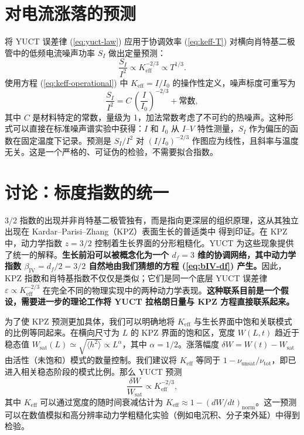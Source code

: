 \documentclass[12pt,a4paper]{article}
\newcommand{\Keff}{K_{\mathrm{eff}}}
\begin{document}
	\section{对电流涨落的预测}
	\label{sec:predictions}
	将 YUCT 误差律 (\ref{eq:yuct-law}) 应用于协调效率 (\ref{eq:keff-T}) 对横向肖特基二极管中的低频电流噪声功率 $S_I$ 做出定量预测：
	\begin{equation}
		\frac{S_I}{I^2} \propto \Keff^{-2/3} \propto T^{1/3}.
		\label{eq:noise-pred}
	\end{equation}
	使用方程 (\ref{eq:keff-operational}) 中 $\Keff = I/I_0$ 的操作性定义，噪声标度可重写为
	\begin{equation}
		\frac{S_I}{I^2} = C \, \left(\frac{I}{I_0}\right)^{-2/3} + \text{常数},
		\label{eq:noise-operational}
	\end{equation}
	其中 $C$ 是材料特定的常数，量级为 1，加法常数考虑了不可约的热噪声。这种形式可以直接在标准噪声谱实验中获得：$I$ 和 $I_0$ 从 $I$–$V$ 特性测量，$S_I$ 作为偏压的函数在固定温度下记录。预测是 $S_I/I^2$ 对 $(I/I_0)^{-2/3}$ 作图应为线性，且斜率与温度无关。这是一个严格的、可证伪的检验，不需要拟合指数。
	
	\section{讨论：标度指数的统一}
	
	$3/2$ 指数的出现并非肖特基二极管独有，而是指向更深层的组织原理，这从其独立出现在 Kardar–Parisi–Zhang（KPZ）表面生长的普适类中 \cite{KPZ} 得到印证。在 KPZ 中，动力学指数 $z = 3/2$ 控制着生长界面的分形粗糙化。YUCT 为这些现象提供了统一的解释。\textbf{生长前沿可以被概念化为一个 $d_f = 3$ 维的协调网络，其中动力学指数 $\beta_{\mathrm{IV}} = d_f/2 = 3/2$ 自然地由我们猜想的方程 (\ref{eq:bIV-df}) 产生。}因此，KPZ 指数和肖特基指数不仅仅是类似；它们是同一个底层 YUCT 误差律 $\varepsilon \propto \Keff^{-2/3}$ 在完全不同的物理实现中的两种动力学表现。\textbf{这种联系目前是一个假设，需要进一步的理论工作将 YUCT 拉格朗日量与 KPZ 方程直接联系起来。}
	
	为了使 KPZ 预测更加具体，我们可以明确地将 $\Keff$ 与生长界面中饱和关联模式的比例等同起来。在横向尺寸为 $L$ 的 KPZ 界面的饱和区，宽度 $W(L,t)$ 趋近于稳态值 $W_{\text{sat}}(L) \simeq \sqrt{\langle h^2 \rangle} \propto L^{\alpha}$，其中 $\alpha = 1/2$。涨落幅度 $\delta W = W(t) - W_{\text{sat}}$ 由活性（未饱和）模式的数量控制。我们建议将 $\Keff$ 等同于 $1 - \nu_{\text{unsat}}/\nu_{\text{tot}}$，即已进入相关稳态阶段的模式比例。那么 YUCT 预测
	\begin{equation}
		\frac{\delta W}{W_{\text{sat}}} \propto \Keff^{-2/3},
		\label{eq:kpz-prediction}
	\end{equation}
	其中 $\Keff$ 可以通过宽度的随时间衰减估计为 $\Keff \approx 1 - (dW/dt)_{\text{norm}}$。这一预测可以在数值模拟和高分辨率动力学粗糙化实验（例如电沉积、分子束外延）中得到检验。
	
\end{document}
